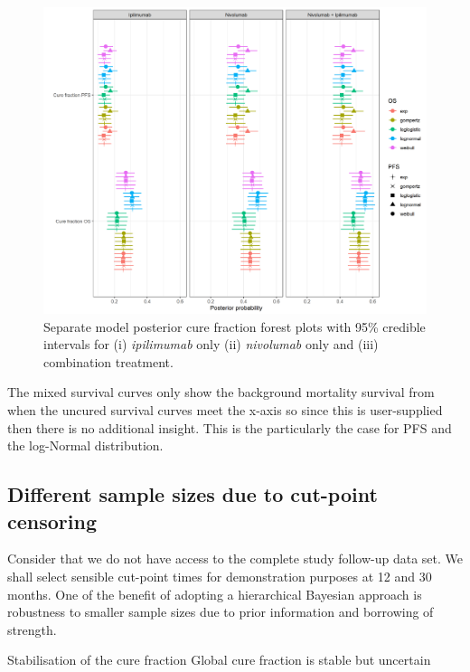 \documentclass[AMA,STIX1COL]{WileyNJD-v2}
\begin{document}
\begin{figure}
\centering
\includegraphics[width=0.9\linewidth]{forest_plot_joint_all_tx_separate.png}
\caption{\label{fig:cf_forest_all_tx_sep} Separate model posterior cure fraction forest plots with 95\% credible intervals for (i) {\it ipilimumab} only (ii) {\it nivolumab} only and (iii) combination treatment.}
\end{figure}

The mixed survival curves only show the background mortality survival from when the uncured survival curves meet the x-axis so since this is user-supplied then there is no additional insight. This is the particularly the case for PFS and the log-Normal distribution.


\subsection{Different sample sizes due to cut-point censoring}
Consider that we do not have access to the complete study follow-up data set.
We shall select sensible cut-point times for demonstration purposes at 12 and 30 months.
One of the benefit of adopting a hierarchical Bayesian approach is robustness to smaller sample sizes due to prior information and borrowing of strength.


Stabilisation of the cure fraction
Global cure fraction is stable but uncertain
\end{document}
